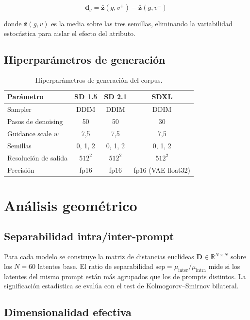\documentclass[12pt, a4paper, twoside]{book}
\newcommand{\z}{\mathbf{z}}
\newcommand{\R}{\mathbb{R}}
\begin{document}
\begin{equation}
\mathbf{d}_g = \bar{\z}(g, v^+) - \bar{\z}(g, v^-)
\label{eq:dir_semantica}
\end{equation}

donde $\bar{\z}(g, v)$ es la media sobre las tres semillas, eliminando la variabilidad estocástica para aislar el efecto del atributo.

\subsection{Hiperparámetros de generación}

\begin{table}[htb]
\centering
\caption{Hiperparámetros de generación del corpus.}
\label{tab:hiper_generacion}
\small
\begin{tabular}{lccc}
\toprule
\textbf{Parámetro} & \textbf{SD 1.5} & \textbf{SD 2.1} & \textbf{SDXL} \\
\midrule
Sampler & DDIM & DDIM & DDIM \\
Pasos de denoising & 50 & 50 & 30 \\
Guidance scale $w$ & 7,5 & 7,5 & 7,5 \\
Semillas & 0, 1, 2 & 0, 1, 2 & 0, 1, 2 \\
Resolución de salida & $512^2$ & $512^2$ & $512^2$ \\
Precisión & fp16 & fp16 & fp16 (VAE float32) \\
\bottomrule
\end{tabular}
\end{table}

\section{Análisis geométrico}
\label{sec:metodos:geometrico}

\subsection{Separabilidad intra/inter-prompt}

Para cada modelo se construye la matriz de distancias euclídeas $\mathbf{D} \in \R^{N \times N}$ sobre los $N = 60$ latentes base. El ratio de separabilidad $\text{sep} = \mu_{\text{inter}} / \mu_{\text{intra}}$ mide si los latentes del mismo prompt están más agrupados que los de prompts distintos. La significación estadística se evalúa con el test de Kolmogorov--Smirnov bilateral.

\subsection{Dimensionalidad efectiva}
\end{document}
